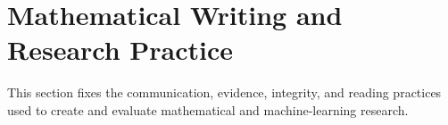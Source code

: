 \section{Mathematical Writing and Research Practice}

This section fixes the communication, evidence, integrity, and reading practices used to create and evaluate mathematical and machine-learning research.












